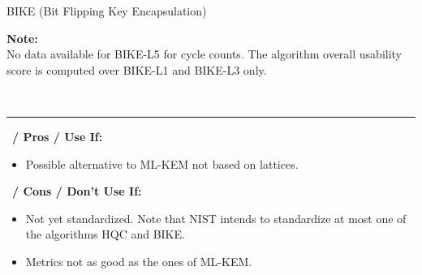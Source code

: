 \begin{algorithmbox}{BIKE (Bit Flipping Key Encapsulation)}
\begin{minipage}[t]{0.6\textwidth}
        {\bfseries Note:}\\
        \normalfont No data available for BIKE-L5 for cycle counts. The algorithm overall usability score is computed over BIKE-L1 and BIKE-L3 only.
    \end{minipage}\\[\baselineskip]
    \hrule
    \vspace{1\baselineskip}
    \begin{minipage}[t]{0.49\textwidth}
        \scriptsize\faThumbsUp\, {\bfseries / Pros / Use If:}
        \begin{itemize}[leftmargin=*]
            \setlength\itemsep{0em}
            \item Possible alternative to ML-KEM not based on lattices.
        \end{itemize}
    \end{minipage}
    \hfill
    \begin{minipage}[t]{0.49\textwidth}
        \scriptsize \faThumbsDown\, {\bfseries / Cons / Don't Use If:}
        \begin{itemize}[leftmargin=*]
            \setlength\itemsep{0em}
            \item Not yet standardized. Note that NIST intends to standardize at most one of the algorithms HQC and BIKE.
            \item Metrics not as good as the ones of ML-KEM.
        \end{itemize}
    \end{minipage}
\end{algorithmbox}

